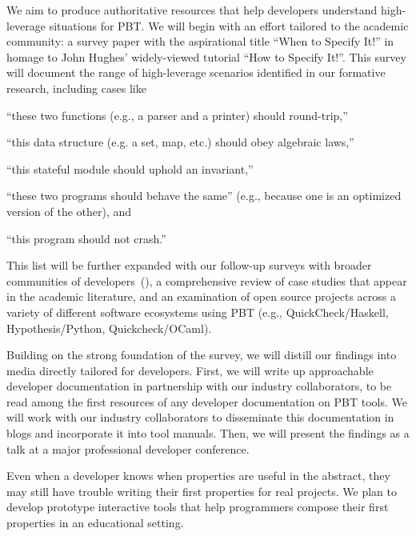 We aim to produce authoritative resources that help developers understand
high-leverage situations for PBT. We will begin with an effort
tailored to the academic community: a survey paper with the
aspirational title ``When to Specify It!'' in homage to John Hughes'
widely-viewed tutorial ``How to Specify It!''. This survey will
document the range of high-leverage scenarios identified in our formative
research, including cases like
\begin{enumerate*}[label=(\arabic{enumi})]
\item ``these two functions (e.g., a parser and a printer) should round-trip,''
\item ``this data structure (e.g. a set, map, etc.) should obey algebraic laws,''
\item ``this stateful module should uphold an invariant,''
\item ``these two programs should behave the same'' (e.g., because one
is an optimized version of the other),
and
\item ``this program should not crash.''
\end{enumerate*}
This list will be further expanded with our follow-up surveys with broader
communities of developers~(), a comprehensive
review of case studies that appear in
the academic literature, and an examination of open source projects across a
variety of different software ecosystems using PBT (e.g.,
QuickCheck/Haskell, Hypothesis/Python, Quickcheck/OCaml).

Building on the strong foundation of the survey, we will distill our findings
into media directly tailored for developers. First, we will write up
approachable developer documentation in partnership with our industry
collaborators, to be read among the first resources of any developer
documentation on PBT tools. We will work with our industry collaborators to
disseminate this documentation in blogs and incorporate it into tool
manuals. Then, we will present the findings as a talk at a
major professional developer conference.

\iflater{}
\fi
%
Even when a developer knows when properties are useful in the abstract,
they may still have trouble writing their first properties
for real projects. We plan to develop prototype interactive tools that help
programmers compose their first properties in an educational setting.

